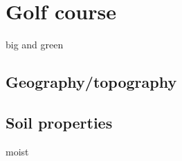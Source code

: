 \section{Golf course}
big and green

\subsection{Geography/topography}


\subsection{Soil properties}
moist